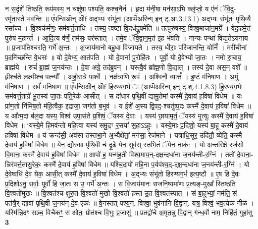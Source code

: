 \documentclass[17pt]{extarticle}
\begin{document}
                  न स॒दृंशे॑ तिष्ठति॒ रूप॑मस्य॒ न चक्षु॑षा पश्यति॒ कश्च॒नैनं᳚ ।  हृ॒दा म॑नी॒षा मन॑सा॒ऽभि क्लृ॑प्तो॒ य ए॑नं ॅवि॒दु-रमृ॑ता॒स्ते भ॑वन्ति ॥  ए꣡पन्सिऒन् ऒf अ॒द्भ्यः संभू॑तः (आप्पॆअरिन्ग् इन् ट्.आ.3.13.1)  अ॒द्भ्यः संभू॑तः पृथि॒व्यै रसा᳚च्च । वि॒श्वक॑र्मणः॒ सम॑वर्त्त॒ताधि॑ ।  तस्य॒ त्वष्टा॑ वि॒दध॑द्रू॒पमे॑ति ॥  तत्पुरु॑षस्य॒ विश्व॒माजा॑न॒मग्रे᳚ ।  वेदा॒हमे॒तं पुरु॑षं म॒हान्तं᳚ ।  आ॒दि॒त्य व॑र्णं॒ तम॑सः॒ पर॑स्तात् ।  तमे॒वं ॅवि॒द्वान॒मृत॑ इ॒ह भ॑वति । नान्यः पन्था॑ विद्य॒तेऽय॑नाय  ॥  प्र॒जाप॑तिश्चरति॒ गर्भे॑ अ॒न्तः । अ॒जाय॑मानो बहु॒धा विजा॑यते । तस्य॒ धीराः॒ परि॑जानन्ति॒ योनिं᳚ । मरी॑चीनां प॒दमि॑च्छन्ति वे॒धसः॑ ॥ यो दे॒वेभ्य॒ आत॑पति । यो दे॒वानां᳚ पु॒रोहि॑तः । पूर्वो॒ यो दे॒वेभ्यो॑ जा॒तः । नमो॑ रु॒चाय॒ ब्राह्म॑ये  ॥ रुचं॑ ब्रा॒ह्मं ज॒नय॑न्तः । दे॒वा अग्रे॒ तद॑ब्रुवन् ।  यस्त्वै॒वं ब्रा᳚ह्म॒णो वि॒द्यात् । तस्य॑ दे॒वा अस॒न् वशे᳚  ॥ ह्रीश्च॑ते ल॒क्ष्मीश्च॒ पत्न्यौ᳚ । अ॒हो॒रा॒त्रे पा॒र्श्वे । नक्ष॑त्राणि रू॒पं ।  अ॒श्विनौ॒ व्यात्तं᳚ । इ॒ष्टं म॑निषाण । अ॒मुं म॑निषाण । सर्वं॑ मनिषाण ॥    ए꣡पन्सिऒन् ऒf हिरण्यग॒र्भ ः (आप्पॆअरिन्ग् इन् ट्.श्.4.1.8.3) हि॒र॒ण्य॒ग॒र्भः सम॑वर्त्त॒ताग्रे॑ भू॒तस्य॑ जा॒तः पति॒रेक॑ आसीत् ।  स दा॑धार पृथि॒वीं द्यामु॒तेमां कस्मै॑ दे॒वाय॑ ह॒विषा॑ विधेम ॥   यः प्रा॑ण॒तो नि॑मिष॒तो म॑हि॒त्वैक॒ इद्राजा॒ जग॑तो ब॒भूव॑ ।  य ईशे॑ अ॒स्य द्वि॒पद॒-श्चतु॑ष्प॒दः कस्मै॑ दे॒वाय॑ ह॒विषा॑ विधेम ॥   य आ᳚त्म॒दा ब॑ल॒दा यस्य॒ विश्व॑ उपा॒स॑ते प्र॒शिषं॒ ॅयस्य॑ दे॒वाः ।  यस्य॑ छा॒यामृतं॒ ॅयस्य॑ मृ॒त्युः कस्मै॑ दे॒वाय॑ ह॒विषा॑ विधेम ॥   ‘यस्ये॒मे हि॒मव॑न्तो महि॒त्वा यस्य॑ समु॒द्रꣳ र॒सया॑ स॒हाऽऽहुः ।  यस्ये॒माः प्र॒दिशो॒ यस्य॑ बा॒हू कस्मै॑ दे॒वाय॑ ह॒विषा॑ विधेम ॥   यं क्रन्द॑सी॒ अव॑सा तस्तभा॒ने अ॒भ्यैक्षे॑तां॒ मन॑सा॒ रेज॑माने ।  यत्राधि॒सूर॒ उदि॑तौ॒ व्येति॒ कस्मै॑ दे॒वाय॑ ह॒विषा॑ विधेम ॥   येन॒ द्यौरु॒ग्रा पृ॑थि॒वी च॑ दृ॒ढे येन॒ सुव॑स् स्तभि॒तं ॅयेन॒ नाक॑: ।  यो अ॒न्तरि॑क्षे॒ रज॑सो वि॒मानः॒ कस्मै॑ दे॒वाय॑ ह॒विषा॑ विधेम ॥   आपो॑ ह॒ यन्म॑ह॒ती विश्व॒माय॒न्-दक्ष॒न्दधा॑ना ज॒नय॑न्ती-र॒ग्निं ।  ततो॑ दे॒वाना॒-न्निर॑वर्त्त॒तासु॒रेकः॒ कस्मै॑ दे॒वाय॑ ह॒विषा॑ विधेम ॥   यश्चि॒दापो॑ महि॒ना प॒र्यप॑श्य॒द्-द्क्ष॒न्दधा॑ना ज॒नय॑न्ती-र॒ग्निं ।  यो दे॒वेष्वधि॑ दे॒व येक॒ आसी॒त् कस्मै॑ दे॒वाय॑ ह॒विषा॑ विधेम ॥   अ॒द्भ्यः संभू॑तो हिरण्यग॒र्भ इत्य॒ष्टौ ॥ ए॒ष हि दे॒वः प्र॒दिशोऽनु॒ सर्वाः॒ पूर्वो॑ हि जा॒तः स उ॒ गर्भे॑ अ॒न्तः ।  स वि॒जाय॑मानः सजनि॒ष्यमा॑णः प्र॒त्यङ्-मुखा᳚ स्तिष्ठति वि॒श्वतो॑मुखः ॥ वि॒श्वत॑श्च-क्षुरु॒त वि॒श्वतो॑ मुखो वि॒श्वतो॑ हस्त उ॒त वि॒श्वत॑स्पात् ।  सं बा॒हुभ्यां॒ नम॑ति॒ सं पत॑त्रै॒र्-द्यावा॑ पृथि॒वी ज॒नय॑न् दे॒व एकः॑ ॥ वे॒नस्तत् पश्य॒न्. विश्वा॒ भुव॑नानि वि॒द्वान्. यत्र॒ विश्वं॒ भव॒त्येक॑-नीळं ।  यस्मि॑न्नि॒दꣳ सञ्च॒ विचैकꣳ॒॒ स ओतः॒ प्रोत॑श्च वि॒भुः प्र॒जासु॑ ॥ प्रतद्वो॑चे अ॒मृत॒न्नु वि॒द्वान् ग॑न्ध॒र्वो नाम॒ निहि॑तं॒ गुहा॑सु \textbf{ 3} \newline
\end{document}
